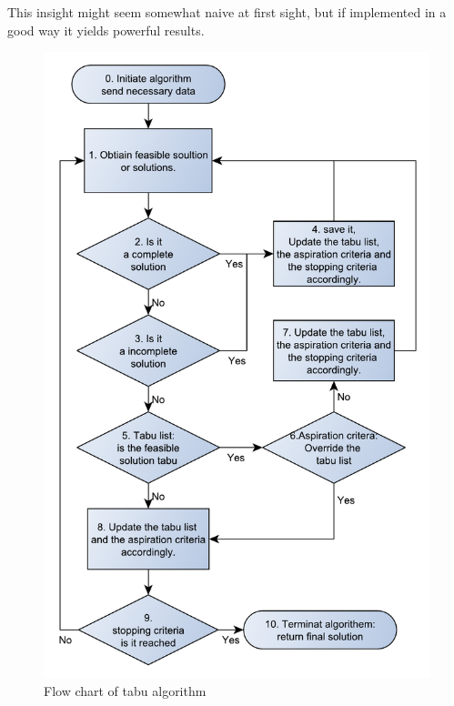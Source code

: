 This insight might seem somewhat naive at first sight, but if implemented in a good way it yields powerful results.
\begin{figure}[!h]
	\centering
	\includegraphics[width=\textwidth]{chapter_4_methods/ny_generel}
  	\caption[Generic flow chart of tabu algorithm]
  	{Flow chart of tabu algorithm}
\end{figure}

